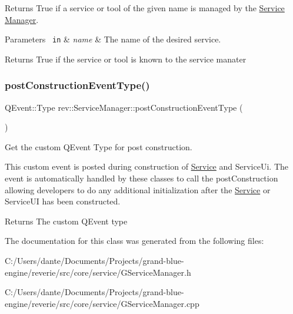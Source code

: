 Returns True if a service or tool of the given name is managed by the \mbox{\hyperlink{classrev_1_1_service}{Service}} \mbox{\hyperlink{classrev_1_1_manager}{Manager}}. 


\begin{DoxyParams}[1]{Parameters}
\mbox{\texttt{ in}}  & {\em name} & The name of the desired service. \\
\hline
\end{DoxyParams}
\begin{DoxyReturn}{Returns}
True if the service or tool is known to the service manater 
\end{DoxyReturn}
\mbox{\label{classrev_1_1_service_manager_a46b5559f5355323714bb47b632d3bc31}} 
\subsubsection{\texorpdfstring{postConstructionEventType()}{postConstructionEventType()}}
{\footnotesize\ttfamily Q\+Event\+::\+Type rev\+::\+Service\+Manager\+::post\+Construction\+Event\+Type (\begin{DoxyParamCaption}{ }\end{DoxyParamCaption})\hspace{0.3cm}{\ttfamily [inline]}}



Get the custom Q\+Event Type for post construction. 

This custom event is posted during construction of \mbox{\hyperlink{classrev_1_1_service}{Service}} and Service\+Ui. The event is automatically handled by these classes to call the post\+Construction allowing developers to do any additional initialization after the \mbox{\hyperlink{classrev_1_1_service}{Service}} or Service\+UI has been constructed. \begin{DoxyReturn}{Returns}
The custom Q\+Event type 
\end{DoxyReturn}


The documentation for this class was generated from the following files\+:\begin{DoxyCompactItemize}
\item 
C\+:/\+Users/dante/\+Documents/\+Projects/grand-\/blue-\/engine/reverie/src/core/service/G\+Service\+Manager.\+h\item 
C\+:/\+Users/dante/\+Documents/\+Projects/grand-\/blue-\/engine/reverie/src/core/service/G\+Service\+Manager.\+cpp\end{DoxyCompactItemize}
